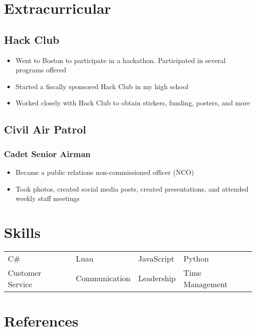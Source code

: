 \documentclass{my_cv}
\begin{document}

\section{Extracurricular}
\subsection{Hack Club}
\begin{itemize}
    \item Went to Boston to participate in a hackathon. Participated in several programs offered
    \item Started a fiscally sponsored Hack Club in my high school
    \item Worked closely with Hack Club to obtain stickers, funding, posters, and more
\end{itemize}

\subsection{Civil Air Patrol}
\subsubsection{Cadet Senior Airman}
\begin{itemize}
    \item Became a public relations non-commissioned officer (NCO)
    \item Took photos, created social media posts, created presentations, and attended weekly staff meetings
\end{itemize}

\section{Skills}
\begin{tabular}{l l l l}
    C\# & Luau & JavaScript & Python \\
    Customer Service & Communication & Leadership & Time Management
\end{tabular}

\section{References}
\end{document}
